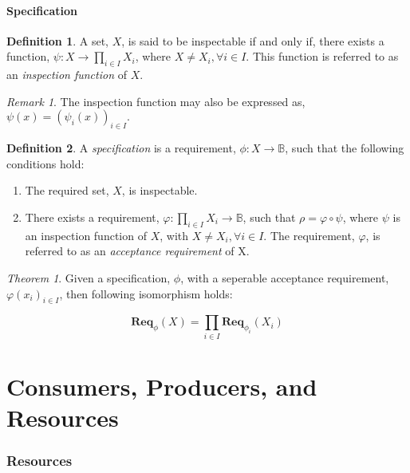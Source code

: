 \documentclass{article}
\theoremstyle{definition}
\newtheorem{definition}{Definition}[section]
\theoremstyle{remark}
\newtheorem*{remark}{Remark}
\theoremstyle{theorem}
\newtheorem*{theorem}{Theorem}
\theoremstyle{definition}
\newcommand{\func}[3]{#1:#2\rightarrow#3}
\newcommand{\reqfunc}[2]{#1:#2\rightarrow\mathbb{B}}
\newcommand{\reqop}[2]{\mathbf{Req}_{#1}(#2)}
\begin{document}
		\subsection{Specification}
		
		\begin{definition}
			A set, $X$, is said to be inspectable if and only if, there exists a function, $\func{\psi}{X}{\prod_{i \in I}{X_{i}}}$, where $X \ne X_{i}, \forall i \in I$. This function is referred to as an \emph{inspection function} of $X$.
		\end{definition}
	
		\begin{remark}
			The inspection function may also be expressed as, $\psi(x) = (\psi_{i}(x))_{i \in I}.$ 
		\end{remark}
		
		\begin{definition}
			A \emph{specification} is a requirement, $\reqfunc{\phi}{X}$, such that the following conditions hold:
			
			\begin{enumerate}
				\item The required set, $X$, is inspectable.
				
				\item There exists a requirement, $\reqfunc{\varphi}{\prod_{i \in I}{X_{i}}}$, such that $\rho = \varphi \circ \psi$, where $\psi$ is an inspection function of $X$, with $X \ne X_{i}, \forall i \in I$. The requirement, $\varphi$, is referred to as an \emph{acceptance requirement} of X.
			\end{enumerate}
		
		\end{definition}
	
		\begin{theorem}
			Given a specification, $\phi$, with a seperable acceptance requirement, $\varphi(x_i)_{i \in I}$, then following isomorphism holds:
			
			\[
			\reqop{\phi}{X} = \prod_{i \in I}\reqop{\phi_{i}}{X_{i}}
			\] 
		\end{theorem}
			
	\part{Consumers, Producers, and Resources}
	
	\section{Resources}
	
\end{document}

